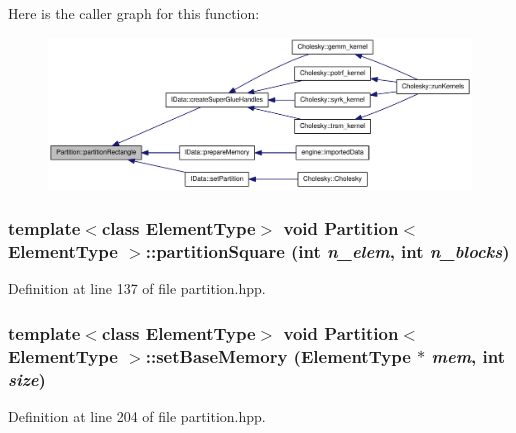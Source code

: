 Here is the caller graph for this function:\nopagebreak
\begin{figure}[H]
\begin{center}
\leavevmode
\includegraphics[width=339pt]{class_partition_a5ca98c67580ef12ca1b2376638fb9714_icgraph}
\end{center}
\end{figure}
\hypertarget{class_partition_a617c37139285d3b510144eb206a15549}{
\subsubsection[{partitionSquare}]{\setlength{\rightskip}{0pt plus 5cm}template$<$class ElementType$>$ void {\bf Partition}$<$ ElementType $>$::partitionSquare (int {\em n\_\-elem}, \/  int {\em n\_\-blocks})}}
\label{class_partition_a617c37139285d3b510144eb206a15549}


Definition at line 137 of file partition.hpp.\hypertarget{class_partition_a8ca97963e7769bec5e7c59f9e4660427}{
\subsubsection[{setBaseMemory}]{\setlength{\rightskip}{0pt plus 5cm}template$<$class ElementType$>$ void {\bf Partition}$<$ ElementType $>$::setBaseMemory (ElementType $\ast$ {\em mem}, \/  int {\em size})}}
\label{class_partition_a8ca97963e7769bec5e7c59f9e4660427}


Definition at line 204 of file partition.hpp.

